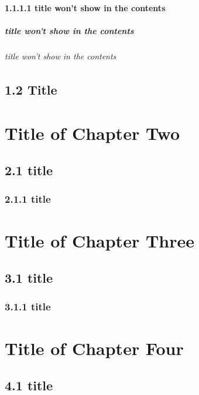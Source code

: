 \documentclass[a4paper, 14pt, UTF8, openright]{book}
\begin{document}
\subsubsection{1.1.1.1 title won't show in the contents}
\lipsum[1-5]

\paragraph{title won't show in the contents}
\lipsum[1-5]

\subparagraph{title won't show in the contents}
\lipsum[1-5]

\section{1.2 Title}
\lipsum[1-5]

\chapter{Title of Chapter Two}
\lipsum[1-5]

\section{2.1 title}
\lipsum[1-5]

\subsection{2.1.1 title}
\lipsum[1-5]

\chapter{Title of Chapter Three}
\lipsum[1-5]

\section{3.1 title}
\lipsum[1-5]

\subsection{3.1.1 title}
\lipsum[1-5]

\chapter{Title of Chapter Four}
\lipsum[1-5]

\section{4.1 title}
\lipsum[1-5]
\end{document}

